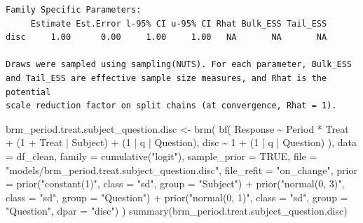 \documentclass[
  12pt,
  a4paper,
  extrafontsizes,
  onecolumn,
  openright]{memoir}
\newenvironment{Shaded}{\begin{snugshade}}{\end{snugshade}}
\newcommand{\AttributeTok}[1]{\textcolor[rgb]{0.40,0.45,0.13}{#1}}
\newcommand{\ConstantTok}[1]{\textcolor[rgb]{0.56,0.35,0.01}{#1}}
\newcommand{\DecValTok}[1]{\textcolor[rgb]{0.68,0.00,0.00}{#1}}
\newcommand{\FunctionTok}[1]{\textcolor[rgb]{0.28,0.35,0.67}{#1}}
\newcommand{\NormalTok}[1]{\textcolor[rgb]{0.00,0.23,0.31}{#1}}
\newcommand{\OtherTok}[1]{\textcolor[rgb]{0.00,0.23,0.31}{#1}}
\newcommand{\SpecialCharTok}[1]{\textcolor[rgb]{0.37,0.37,0.37}{#1}}
\newcommand{\StringTok}[1]{\textcolor[rgb]{0.13,0.47,0.30}{#1}}
\begin{document}
\begin{verbatim}
Family Specific Parameters: 
     Estimate Est.Error l-95% CI u-95% CI Rhat Bulk_ESS Tail_ESS
disc     1.00      0.00     1.00     1.00   NA       NA       NA

Draws were sampled using sampling(NUTS). For each parameter, Bulk_ESS
and Tail_ESS are effective sample size measures, and Rhat is the potential
scale reduction factor on split chains (at convergence, Rhat = 1).
\end{verbatim}

\begin{Shaded}
\begin{Highlighting}[]
\NormalTok{brm\_period.treat.subject\_question.disc }\OtherTok{\textless{}{-}} \FunctionTok{brm}\NormalTok{(}
    \FunctionTok{bf}\NormalTok{(}
\NormalTok{        Response }\SpecialCharTok{\textasciitilde{}}\NormalTok{ Period }\SpecialCharTok{*}\NormalTok{ Treat }\SpecialCharTok{+}\NormalTok{ (}\DecValTok{1} \SpecialCharTok{+}\NormalTok{ Treat }\SpecialCharTok{|}\NormalTok{ Subject) }\SpecialCharTok{+}\NormalTok{ (}\DecValTok{1} \SpecialCharTok{|}\NormalTok{ q }\SpecialCharTok{|}\NormalTok{ Question),}
\NormalTok{        disc }\SpecialCharTok{\textasciitilde{}} \DecValTok{1} \SpecialCharTok{+}\NormalTok{ (}\DecValTok{1} \SpecialCharTok{|}\NormalTok{ q }\SpecialCharTok{|}\NormalTok{ Question)}
\NormalTok{    ),}
    \AttributeTok{data =}\NormalTok{ df\_clean,}
    \AttributeTok{family =} \FunctionTok{cumulative}\NormalTok{(}\StringTok{"logit"}\NormalTok{),}
    \AttributeTok{sample\_prior =} \ConstantTok{TRUE}\NormalTok{,}
    \AttributeTok{file =} \StringTok{"models/brm\_period.treat.subject\_question.disc"}\NormalTok{,}
    \AttributeTok{file\_refit =} \StringTok{"on\_change"}\NormalTok{,}
    \AttributeTok{prior =} \FunctionTok{prior}\NormalTok{(}\StringTok{"constant(1)"}\NormalTok{, }\AttributeTok{class =} \StringTok{"sd"}\NormalTok{, }\AttributeTok{group =} \StringTok{"Subject"}\NormalTok{) }\SpecialCharTok{+}
        \FunctionTok{prior}\NormalTok{(}\StringTok{"normal(0, 3)"}\NormalTok{, }\AttributeTok{class =} \StringTok{"sd"}\NormalTok{, }\AttributeTok{group =} \StringTok{"Question"}\NormalTok{) }\SpecialCharTok{+}
        \FunctionTok{prior}\NormalTok{(}\StringTok{"normal(0, 1)"}\NormalTok{, }\AttributeTok{class =} \StringTok{"sd"}\NormalTok{, }\AttributeTok{group =} \StringTok{"Question"}\NormalTok{, }\AttributeTok{dpar =} \StringTok{"disc"}\NormalTok{)}
\NormalTok{)}
\FunctionTok{summary}\NormalTok{(brm\_period.treat.subject\_question.disc)}
\end{Highlighting}
\end{Shaded}
\end{document}

